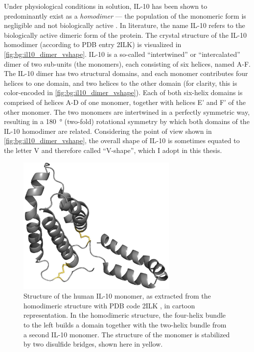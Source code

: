 Under physiological conditions in solution, IL-10 has been shown to
predominantly exist as a \textit{homodimer} --- the population of the monomeric
form is negligible and not biologically active \cite{syto_il10_homodimer_1998}.
In literature, the name IL-10 refers to the biologically active dimeric form of
the protein. The crystal structure of the IL-10 homodimer (according to PDB
entry 2ILK) is visualized in \cref{fig:bg:il10_dimer_vshape}. IL-10 is a
so-called \enquote{intertwined} or \enquote{intercalated} dimer of two sub-units
(the monomers), each consisting of six helices, named A-F. The IL-10 dimer has
two structural domains, and each monomer contributes four helices to one domain,
and two helices to the other domain (for clarity, this is color-encoded in
\cref{fig:bg:il10_dimer_vshape}). Each of both six-helix domains is comprised of
helices A-D of one monomer, together with helices E' and F' of the other
monomer. The two monomers are intertwined in a perfectly symmetric way,
resulting in a \SI{180}{\degree} (two-fold) rotational symmetry by which both
domains of the IL-10 homodimer are related. Considering the point of view shown
in \cref{fig:bg:il10_dimer_vshape}, the overall shape of IL-10 is sometimes
equated to the letter V and therefore called \enquote{V-shape}, which I adopt in
this thesis.

\begin{figure}
\centering
\includegraphics[width=0.7\textwidth]{gfx/background/IL10_2ilk_disulfide_with.jpg}
\caption[]{
Structure of the human IL-10 monomer, as extracted from the homodimeric
structure with PDB code 2ILK \cite{Zdanov1996}, in cartoon representation. In
the homodimeric structure, the four-helix bundle to the left builds a domain
together with the two-helix bundle from a second IL-10 monomer. The structure of
the monomer is stabilized by two disulfide bridges, shown here in yellow. }
\label{fig:bg:il10_monomer_disulfide}
\end{figure}

